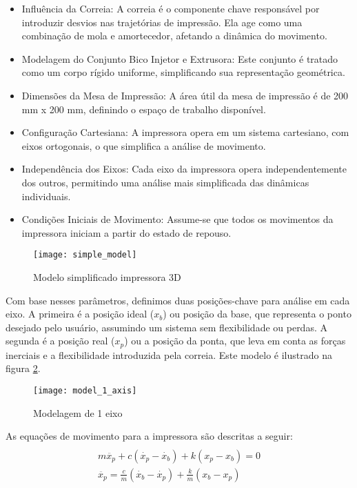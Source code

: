 \begin{itemize}
    \item Influência da Correia: A correia é o componente chave responsável por introduzir desvios nas trajetórias de impressão. Ela age como uma combinação de mola e amortecedor, afetando a dinâmica do movimento.
    \item Modelagem do Conjunto Bico Injetor e Extrusora: Este conjunto é tratado como um corpo rígido uniforme, simplificando sua representação geométrica.
    \item Dimensões da Mesa de Impressão: A área útil da mesa de impressão é de 200 mm x 200 mm, definindo o espaço de trabalho disponível.
    \item Configuração Cartesiana: A impressora opera em um sistema cartesiano, com eixos ortogonais, o que simplifica a análise de movimento.
    \item Independência dos Eixos: Cada eixo da impressora opera independentemente dos outros, permitindo uma análise mais simplificada das dinâmicas individuais.
    \item Condições Iniciais de Movimento: Assume-se que todos os movimentos da impressora iniciam a partir do estado de repouso.
\end{itemize}

\begin{figure}[H]
    \centering
    \caption{Modelo simplificado impressora 3D}
    \texttt{[image: simple\_model]}
    \label{fig:simple_model}
\end{figure}

Com base nesses parâmetros, definimos duas posições-chave para análise em cada eixo. A primeira é a posição ideal (\(x_b\)) ou posição da base, que representa o ponto desejado pelo usuário, assumindo um sistema sem flexibilidade ou perdas. A segunda é a posição real (\(x_p\)) ou a posição da ponta, que leva em conta as forças inerciais e a flexibilidade introduzida pela correia. Este modelo é ilustrado na figura \ref{fig:model_1_axis}.

\begin{figure}[H]
    \centering
    \caption{Modelagem de 1 eixo}
    \texttt{[image: model\_1\_axis]}

    \label{fig:model_1_axis}
\end{figure}

As equações de movimento para a impressora são descritas a seguir:
\begin{multline}
    \label{eq:mov_impressora}
    \\
    m \ddot{x_p} + c(\dot{x_p} - \dot{x_b}) + k(x_p-x_b) = 0 \\
    \ddot{x_p} = \frac{c}{m}(\dot{x_b} - \dot{x_p}) + \frac{k}{m}(x_b - x_p)\\
\end{multline}

